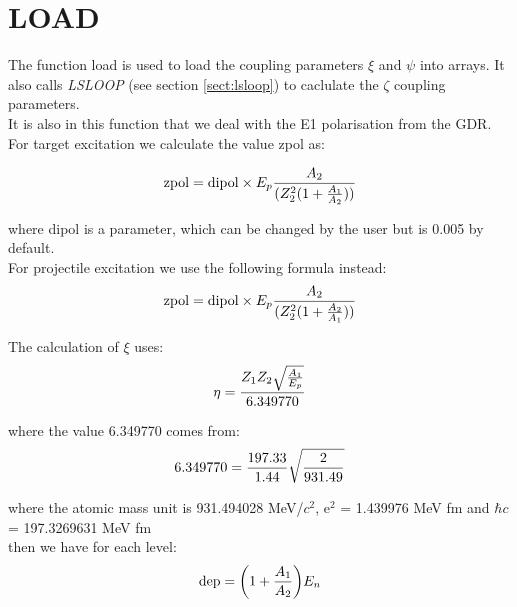 \section{LOAD}
\label{sect:load}

The function load is used to load the coupling parameters $\xi$ and $\psi$
into arrays. It also calls {\em LSLOOP} (see section \ref{sect:lsloop}) to
caclulate the $\zeta$ coupling parameters.\\

\noindent It is also in this function that we deal with the E1 polarisation from the
GDR. For target excitation we calculate the value zpol as:

\begin{equation}
\mathrm{zpol} = \mathrm{dipol} \times E_p {A_2 \over(Z_2^2 (1 + {A_1 \over
A_2}))}
\end{equation}

\noindent where dipol is a parameter, which can be changed by the user but is 0.005 by
default.\\

\noindent For projectile excitation we use the following formula instead:\\

\begin{equation}
\mathrm{zpol} = \mathrm{dipol} \times E_p {A_2 \over(Z_2^2 (1 + {A_2 \over
A_1}))}
\end{equation}

\noindent The calculation of $\xi$ uses:\\

\begin{equation}
\eta = {Z_1 Z_2 \sqrt{A_1 \over E_p} \over 6.349770}
\end{equation}

\noindent where the value 6.349770 comes from:\\

\begin{equation}
6.349770 = {197.33 \over 1.44} \sqrt{2 \over 931.49}
\end{equation}

\noindent where the atomic mass unit is 931.494028 MeV/$c^2$, e$^2$ =
1.439976 MeV fm and $\hbar c$ = 197.3269631 MeV fm\\

\noindent then we have for each level:\\

\begin{equation}
\mathrm{dep} = \bigg( 1 + {A_1 \over A_2} \bigg) E_n
\end{equation}

